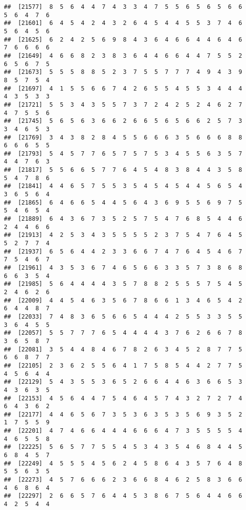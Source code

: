 \documentclass[
]{book}
\begin{document}
\begin{verbatim}
##  [21577]  8  5  6  4  4  7  4  3  3  4  7  5  5  6  5  6  5  6  6  5  6  4  7  6
##  [21601]  6  4  5  4  2  4  3  2  6  4  5  4  4  5  5  3  7  4  6  5  6  4  5  6
##  [21625]  6  2  4  2  5  6  9  8  4  3  6  4  6  6  4  4  6  4  6  7  6  6  6  6
##  [21649]  4  6  6  8  2  3  8  3  6  4  4  6  6  4  4  7  5  5  2  6  5  6  7  5
##  [21673]  5  5  5  8  8  5  2  3  7  5  5  7  7  7  4  9  4  3  9  8  5  7  5  4
##  [21697]  4  1  5  5  6  6  7  4  2  6  5  5  4  5  5  3  4  4  4  4  3  5  3  3
##  [21721]  5  5  3  4  3  5  5  7  3  7  2  4  2  5  2  4  6  2  7  4  7  5  5  6
##  [21745]  5  6  5  6  3  6  6  2  6  6  5  6  5  6  6  2  5  7  3  3  4  6  5  3
##  [21769]  3  4  3  8  2  8  4  5  5  6  6  6  3  5  6  6  6  8  8  6  6  6  5  5
##  [21793]  5  4  5  7  7  6  5  7  5  7  5  3  4  5  5  6  3  5  7  4  4  7  6  3
##  [21817]  5  5  6  6  5  7  7  6  4  5  4  8  3  8  4  4  3  5  8  5  4  7  8  6
##  [21841]  4  4  6  5  7  5  5  3  5  4  5  4  5  4  4  5  6  5  4  3  6  5  6  4
##  [21865]  6  4  6  6  5  4  4  5  6  4  3  6  9  5  5  6  9  7  5  5  4  6  5  4
##  [21889]  6  4  3  6  7  3  5  2  5  7  5  4  7  6  8  5  4  4  6  2  4  4  6  6
##  [21913]  4  2  5  3  4  3  5  5  5  5  2  3  7  5  4  7  6  4  5  5  2  7  7  4
##  [21937]  6  5  6  4  4  2  3  3  6  6  7  4  7  6  4  5  4  6  7  7  5  4  6  7
##  [21961]  4  3  5  3  6  7  4  6  5  6  6  3  3  5  7  3  8  6  8  6  6  3  5  4
##  [21985]  5  6  4  4  4  4  3  5  7  8  8  2  5  5  5  7  5  4  5  2  4  6  2  6
##  [22009]  4  4  5  4  6  3  5  6  7  8  6  6  1  3  4  6  5  4  2  6  4  4  8  7
##  [22033]  7  4  8  3  6  5  6  6  5  4  4  4  2  5  5  3  3  5  5  3  6  4  5  5
##  [22057]  5  5  7  7  7  6  5  4  4  4  4  3  7  6  2  6  6  7  8  3  6  5  8  7
##  [22081]  3  5  4  4  8  4  6  7  8  2  6  3  4  5  2  8  7  7  5  6  6  8  7  7
##  [22105]  2  3  6  2  5  5  6  4  1  7  5  8  5  4  4  2  7  7  5  4  5  6  4  4
##  [22129]  5  4  3  5  5  3  6  5  2  6  6  4  4  6  3  6  6  5  3  4  3  6  3  5
##  [22153]  4  5  6  4  4  7  5  4  6  4  5  7  4  3  2  7  2  7  4  6  4  3  6  2
##  [22177]  4  4  6  5  6  7  3  5  3  6  3  5  3  5  6  9  3  5  2  1  7  5  5  9
##  [22201]  4  7  4  6  6  4  4  4  6  6  6  4  7  3  5  5  5  5  4  4  6  5  5  8
##  [22225]  5  6  5  7  7  5  5  4  5  3  4  3  5  4  6  8  4  4  5  6  8  4  5  7
##  [22249]  4  5  5  5  4  5  6  2  4  5  8  6  4  3  5  7  6  4  8  5  5  6  3  5
##  [22273]  4  5  7  6  6  6  2  3  6  6  8  4  6  2  5  8  3  6  6  4  6  8  6  4
##  [22297]  2  6  6  5  7  6  4  4  5  3  8  6  7  5  6  4  4  6  6  4  2  5  4  4

\end{verbatim}
\end{document}
